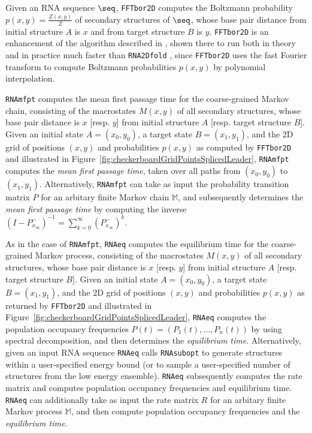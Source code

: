 Given an RNA sequence $\seq$,  {\tt FFTbor2D} computes the Boltzmann probability
$p(x,y) = \frac{Z(x,y)}{Z}$ of secondary structures of $\seq$, whose base
pair distance from initial structure $A$ is $x$ and from target structure
$B$ is $y$. {\tt FFTbor2D} is an enhancement of the algorithm
described in \cite{Senter.jmb14}, shown there
to run both in theory and in practice much faster than {\tt RNA2Dfold}
\cite{hofacker:RNAbor2D},
since {\tt FFTbor2D} uses the fast Fourier transform to
compute Boltzmann probabilities $p(x,y)$ by polynomial interpolation.


{\tt RNAmfpt} computes the mean first passage time for the
coarse-grained Markov chain,
consisting of the macrostates $M(x,y)$ of all secondary structures,
whose base pair distance is $x$ [resp. $y$] from initial structure $A$
[resp. target structure $B$].
Given an initial state $A=(x_0,y_0)$, a
target state $B=(x_1,y_1)$, and the 2D grid of positions $(x,y)$
and probabilities $p(x,y)$ as computed by {\tt FFTbor2D} and
illustrated in
Figure~\ref{fig:checkerboardGridPointsSplicedLeader},
{\tt RNAmfpt} computes the {\em mean first passage time}, taken
over all paths from $(x_0,y_0)$ to  $(x_1,y_1)$.  Alternatively,
{\tt RNAmfpt} can take as input the probability transition matrix $P$ for
an arbitary finite Markov chain $\mathbb{M}$, and subsequently
determines the {\em mean first passage time} by computing the inverse
$(I - P^{-}_{x_{\infty}})^{-1} = \displaystyle\sum_{k=0}^{\infty}
(P^{-}_{x_{\infty}})^k$.


As in the case of {\tt RNAmfpt}, {\tt RNAeq}
computes the equilibrium time for the coarse-grained Markov process,
consisting of the macrostates $M(x,y)$ of all secondary structures,
whose base pair distance is $x$ [resp. $y$] from initial structure $A$
[resp. target structure $B$].
Given an initial state $A=(x_0,y_0)$, a
target state $B=(x_1,y_1)$, and the 2D grid of positions $(x,y)$
and probabilities $p(x,y)$ as returned by {\tt FFTbor2D} and
illustrated in
Figure~\ref{fig:checkerboardGridPointsSplicedLeader},
{\tt RNAeq} computes the population occupancy frequencies
$P(t) = (P_1(t),\ldots,P_n(t))$ by using spectral decomposition, and
then determines the {\em equilibrium time}.
Alternatively, given an input RNA sequence {\tt RNAeq}
calls {\tt RNAsubopt} \cite{wuchtyFontanaHofackerSchuster} to generate
structures within a user-specified energy bound (or to sample a user-specified
number of structures from the low energy ensemble). {\tt RNAeq} subsequently
computes the rate matrix and computes population occupancy frequencies
and equilibrium time. {\tt RNAeq} can additionally
take as input the rate matrix $R$ for
an arbitary finite Markov process $\mathbb{M}$, and then
compute population occupancy frequencies
and the {\em equilibrium time}.

